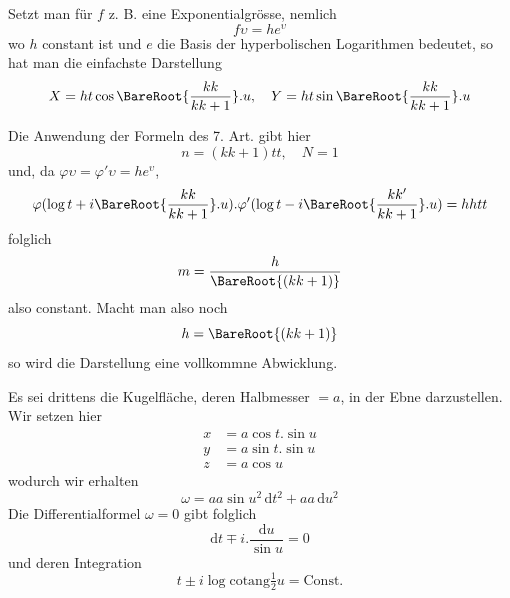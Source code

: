 \par\indent{}%
Setzt man für \(f\) z. B. eine Exponentialgrösse, nemlich
\[
f\upsilon=he^{\upsilon}
\]
\noindent wo \(h\) constant ist und \(e\) die Basis der hyperbolischen Logarithmen bedeutet, so hat man die einfachste Darstellung
\[
X=ht\cos\BareRoot{\frac{kk}{kk+1}}\mathord{.}u,\quad
Y=ht\sin\BareRoot{\frac{kk}{kk+1}}\mathord{.}u
\]

Die Anwendung der Formeln des 7. Art. gibt hier
\[
n=(kk+1)tt,\quad N=1
\]
\noindent und, da \(\varphi\upsilon=\varphi'\upsilon=he^{\upsilon}\),
\[
\varphi(\log t+i\BareRoot{\frac{kk}{kk+1}}\mathord{.}u)\mathord{.}\varphi'(\log t-i\BareRoot{\frac{kk'}{kk+1}}\mathord{.}u)=hhtt
\]
\noindent folglich
\[
m=\frac{h}{\BareRoot{(kk+1)}}
\]
\noindent also constant. Macht man also noch
\[
h=\BareRoot{(kk+1)}
\]
\noindent so wird die Darstellung eine vollkommne Abwicklung.

Es sei drittens die Kugelfläche, deren Halbmesser \(=a\), in der Ebne darzustellen. Wir setzen hier
\[
\begin{aligned}
x&=a\cos t\mathord{.}\sin u\\
y&=a\sin t\mathord{.}\sin u\\
z&=a\cos u
\end{aligned}
\]
\noindent wodurch wir erhalten
\[
\omega=aa\sin u^2\,\mathrm{d}t^2+aa\,\mathrm{d}u^2
\]
\noindent Die Differentialformel \(\omega=0\) gibt folglich
\[
\mathrm{d}t\mp i\mathord{.}\frac{\mathrm{d}u}{\sin u}=0
\]
\noindent und deren Integration
\[
t\pm i\log\mathrm{cotang}\tfrac{1}{2}u=\text{Const.}
\]
